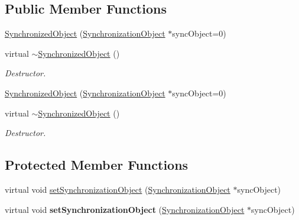 \subsection*{Public Member Functions}
\begin{DoxyCompactItemize}
\item 
\hyperlink{class_synchronized_object_a2f3b055215912d438081b2041dd8c238}{Synchronized\+Object} (\hyperlink{class_synchronized_object_1_1_synchronization_object}{Synchronization\+Object} $\ast$sync\+Object=0)
\item 
\hypertarget{class_synchronized_object_a5ba819c86c7515bbdf7d7bcc59adce5c}{virtual \hyperlink{class_synchronized_object_a5ba819c86c7515bbdf7d7bcc59adce5c}{$\sim$\+Synchronized\+Object} ()}\label{class_synchronized_object_a5ba819c86c7515bbdf7d7bcc59adce5c}

\begin{DoxyCompactList}\small\item\em Destructor. \end{DoxyCompactList}\item 
\hyperlink{class_synchronized_object_a9ae8017720af72aac92964f23b55d6f1}{Synchronized\+Object} (\hyperlink{class_synchronized_object_1_1_synchronization_object}{Synchronization\+Object} $\ast$sync\+Object=0)
\item 
\hypertarget{class_synchronized_object_ae2c081d2e252b35a49edbf887579cfe0}{virtual \hyperlink{class_synchronized_object_ae2c081d2e252b35a49edbf887579cfe0}{$\sim$\+Synchronized\+Object} ()}\label{class_synchronized_object_ae2c081d2e252b35a49edbf887579cfe0}

\begin{DoxyCompactList}\small\item\em Destructor. \end{DoxyCompactList}\end{DoxyCompactItemize}
\subsection*{Protected Member Functions}
\begin{DoxyCompactItemize}
\item 
virtual void \hyperlink{class_synchronized_object_accde14a0c62a66c00ef882d7c7cbca0b}{set\+Synchronization\+Object} (\hyperlink{class_synchronized_object_1_1_synchronization_object}{Synchronization\+Object} $\ast$sync\+Object)
\item 
\hypertarget{class_synchronized_object_a72f0856ba79569fea9907916e085c555}{virtual void {\bfseries set\+Synchronization\+Object} (\hyperlink{class_synchronized_object_1_1_synchronization_object}{Synchronization\+Object} $\ast$sync\+Object)}\label{class_synchronized_object_a72f0856ba79569fea9907916e085c555}

\end{DoxyCompactItemize}
